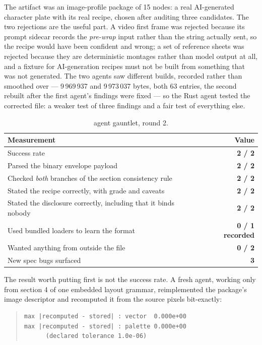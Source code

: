 \documentclass[10pt,twocolumn,letterpaper]{article}
\begin{document}
The artifact was an image-profile package of 15 nodes: a real AI-generated character plate with its real recipe, chosen after auditing three candidates. The two rejections are the useful part. A video first frame was rejected because its prompt sidecar records the \emph{pre-wrap} input rather than the string actually sent, so the recipe would have been confident and wrong; a set of reference sheets was rejected because they are deterministic montages rather than model output at all, and a fixture for AI-generation recipes must not be built from something that was not generated. The two agents saw different builds, recorded rather than smoothed over --- 9\,969\,937 and 9\,973\,037 bytes, both 63 entries, the second rebuilt after the first agent's findings were fixed --- so the Rust agent tested the corrected file: a weaker test of three findings and a fair test of everything else.

\begin{table}[t]\centering\footnotesize
\caption{agent gauntlet, round 2.}
\begin{tabular}{@{}L{4.6cm} r@{}}
\toprule
Measurement & Value \\
\midrule
Success rate & \textbf{2 / 2} \\
Parsed the binary envelope payload & \textbf{2 / 2} \\
Checked \emph{both} branches of the section consistency rule & \textbf{2 / 2} \\
Stated the recipe correctly, with grade and caveats & \textbf{2 / 2} \\
Stated the disclosure correctly, including that it binds nobody & \textbf{2 / 2} \\
Used bundled loaders to learn the format & \textbf{0 / 1 recorded} \\
Wanted anything from outside the file & \textbf{0 / 2} \\
New spec bugs surfaced & \textbf{3} \\
\bottomrule
\end{tabular}
\end{table}

The result worth putting first is not the success rate. A fresh agent, working only from section 4 of one embedded layout grammar, reimplemented the package's image descriptor and recomputed it from the source pixels bit-exactly:

\begin{quote}\footnotesize\begin{verbatim}
max |recomputed - stored| : vector  0.000e+00
max |recomputed - stored| : palette 0.000e+00
      (declared tolerance 1.0e-06)
\end{verbatim}\end{quote}
\end{document}
